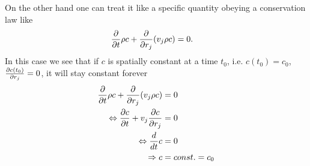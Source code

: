 On the other hand one can treat it like a specific quantity obeying a
conservation law like
\begin{align}
\pd{t} \rho c + \pd{r_j}(v_j \rho c) &= 0.
\end{align}
In this case we see that if $c$ is spatially constant at a time $t_0$, i.e. 
$c(t_0)=c_0$, $\ppd{r_j}{c(t_0)}=0$, it will stay constant forever
\begin{align*}
\pd{t} \rho c + \pd{r_j}(v_j \rho c) &= 0 \\
\Leftrightarrow \ppd{t}{c} + v_j \ppd{r_j}{c} &= 0 \\
\Leftrightarrow \td{t} c &=0\\
\Rightarrow c &= const. = c_0
\end{align*}

